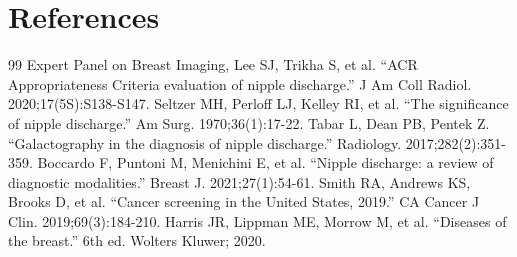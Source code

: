 \section*{References}
\begin{thebibliography}{99}
 Expert Panel on Breast Imaging, Lee SJ, Trikha S, et al. ``ACR Appropriateness Criteria evaluation of nipple discharge.'' J Am Coll Radiol. 2020;17(5S):S138-S147.
 Seltzer MH, Perloff LJ, Kelley RI, et al. ``The significance of nipple discharge.'' Am Surg. 1970;36(1):17-22.
 Tabar L, Dean PB, Pentek Z. ``Galactography in the diagnosis of nipple discharge.'' Radiology. 2017;282(2):351-359.
 Boccardo F, Puntoni M, Menichini E, et al. ``Nipple discharge: a review of diagnostic modalities.'' Breast J. 2021;27(1):54-61.
 Smith RA, Andrews KS, Brooks D, et al. ``Cancer screening in the United States, 2019.'' CA Cancer J Clin. 2019;69(3):184-210.
 Harris JR, Lippman ME, Morrow M, et al. ``Diseases of the breast.'' 6th ed. Wolters Kluwer; 2020.
\end{thebibliography}
